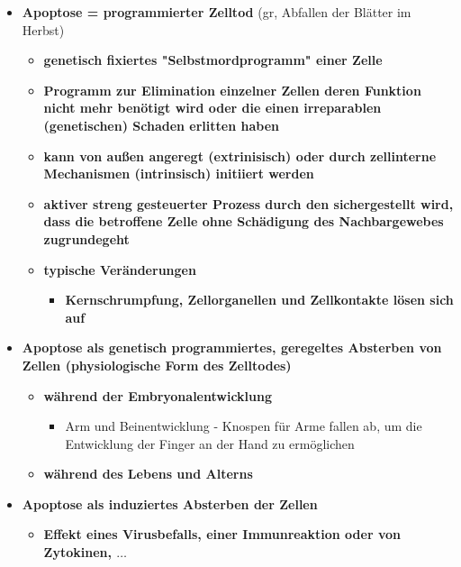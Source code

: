 	\begin{itemize}
		\item \textbf{Apoptose = programmierter Zelltod} (gr, Abfallen der Blätter im Herbst)
			\begin{itemize}
				\item \textbf{genetisch fixiertes "Selbstmordprogramm" einer Zelle}
				\item \textbf{Programm zur Elimination einzelner Zellen deren Funktion nicht mehr benötigt wird oder die einen irreparablen (genetischen) Schaden erlitten haben}
				\item \textbf{kann von außen angeregt (extrinisisch) oder durch  zellinterne Mechanismen (intrinsisch) initiiert werden}
				\item \textbf{aktiver streng gesteuerter Prozess durch den sichergestellt wird, dass die betroffene Zelle ohne Schädigung des Nachbargewebes zugrundegeht}
				\item \textbf{typische Veränderungen}
					\begin{itemize}
						\item \textbf{Kernschrumpfung, Zellorganellen und Zellkontakte lösen sich auf}
					\end{itemize}
			\end{itemize}
		\item \textbf{Apoptose als genetisch programmiertes, geregeltes Absterben von Zellen (physiologische Form des Zelltodes)}
			\begin{itemize}
				\item \textbf{während der Embryonalentwicklung}
					\begin{itemize}
						\item Arm und Beinentwicklung - Knospen für Arme fallen ab, um die Entwicklung der Finger an der Hand zu ermöglichen
					\end{itemize}
				\item \textbf{während des Lebens und Alterns}
			\end{itemize}
		\item \textbf{Apoptose als induziertes Absterben der Zellen}
			\begin{itemize}
				\item \textbf{Effekt eines Virusbefalls, einer Immunreaktion oder von Zytokinen, $\dots$}
			\end{itemize}
	\end{itemize}

